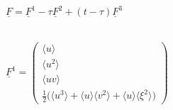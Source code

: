 \documentclass[
	pdftex,             %
	12pt,				%
	a4paper,		   	%
	english,				%
	oneside,			%
]{article}
\newcommand{\mom}[1]{\langle #1 \rangle}
\newcommand{\uu}[1]{\underline{#1}}
\begin{document}
~\\

\begin{math}
\uu{F} = \uu{F}^1 - \tau \uu{F}^2 + (t - \tau) \uu{F}^3
\end{math}

~\\

\begin{math}
\uu{F}^1 = 
\begin{pmatrix}
\mom{u} \\ 
\mom{u^2} \\ 
\mom{uv} \\ 
\frac{1}{2} \big(\mom{u^3} + \mom{u}\mom{v^2} + \mom{u}\mom{\xi^2} \big)
\end{pmatrix}
\end{math}

~\\
\end{document}
